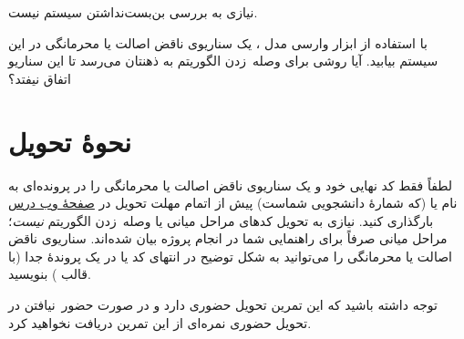 \documentclass[a4paper]{article}
\begin{document}
نیازی به بررسی بن‌بست‌نداشتن سیستم نیست.

با استفاده از ابزار وارسی مدل ، یک سناریوی ناقض اصالت یا محرمانگی در این سیستم بیابید.
آیا روشی برای وصله~زدن الگوریتم به ذهنتان می‌رسد تا این سناریو اتفاق نیفتد؟

\section*{نحوهٔ تحویل}

لطفاً فقط کد نهایی خود و یک سناریوی ناقض اصالت یا محرمانگی را در پرونده‌ای به نام  یا  (که  شمارهٔ دانشجویی شماست) پیش از اتمام مهلت تحویل در \href{https://cecm.ut.ac.ir/course/view.php?id=2809}{صفحهٔ وب درس} بارگذاری کنید.
نیازی به تحویل کدهای مراحل میانی یا وصله~زدن الگوریتم \textit{نیست}؛ مراحل میانی صرفاً برای راهنمایی شما در انجام پروژه بیان شده‌اند.
سناریوی ناقض اصالت یا محرمانگی را می‌توانید به شکل توضیح در انتهای کد یا در یک پروندهٔ جدا (با قالب ) بنویسید.

توجه داشته باشید که این تمرین تحویل حضوری دارد و در صورت حضور~نیافتن در تحویل حضوری نمره‌ای از این تمرین دریافت نخواهید کرد.
 
\end{document}
